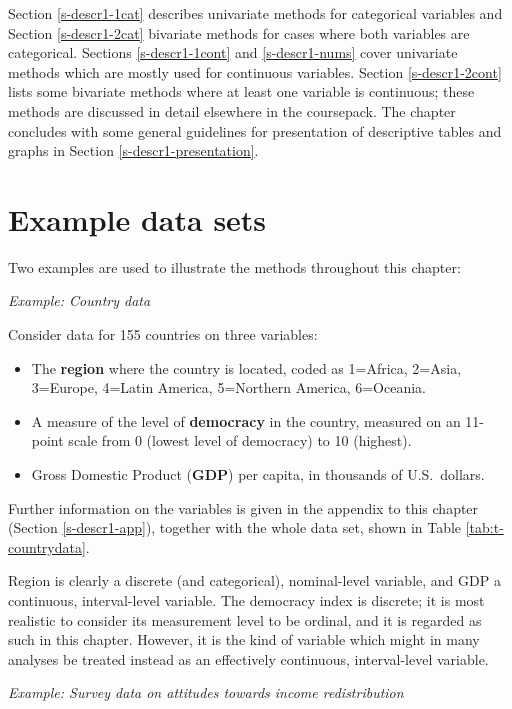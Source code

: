 \documentclass[11pt,a4paper,openany]{book}
\begin{document}
Section \ref{s-descr1-1cat} describes univariate methods for categorical
variables and Section \ref{s-descr1-2cat} bivariate methods for cases
where both variables are categorical. Sections \ref{s-descr1-1cont} and
\ref{s-descr1-nums} cover univariate methods which are mostly used for
continuous variables. Section \ref{s-descr1-2cont} lists some bivariate
methods where at least one variable is continuous; these methods are
discussed in detail elsewhere in the coursepack. The chapter concludes
with some general guidelines for presentation of descriptive tables and
graphs in Section \ref{s-descr1-presentation}.

\section{Example data sets}\label{s-descr1-examples}

Two examples are used to illustrate the methods throughout this chapter:

\emph{Example: Country data} \label{country_example}

Consider data for 155 countries on three variables:

\begin{itemize}
\item
  The \textbf{region} where the country is located, coded as 1=Africa,
  2=Asia, 3=Europe, 4=Latin America, 5=Northern America, 6=Oceania.
\item
  A measure of the level of \textbf{democracy} in the country, measured
  on an 11-point scale from 0 (lowest level of democracy) to 10
  (highest).
\item
  Gross Domestic Product (\textbf{GDP}) per capita, in thousands of
  U.S.~dollars.
\end{itemize}

Further information on the variables is given in the appendix to this
chapter (Section \ref{s-descr1-app}), together with the whole data set,
shown in Table \ref{tab:t-countrydata}.

Region is clearly a discrete (and categorical), nominal-level variable,
and GDP a continuous, interval-level variable. The democracy index is
discrete; it is most realistic to consider its measurement level to be
ordinal, and it is regarded as such in this chapter. However, it is the
kind of variable which might in many analyses be treated instead as an
effectively continuous, interval-level variable.

\emph{Example: Survey data on attitudes towards income redistribution}
\end{document}
